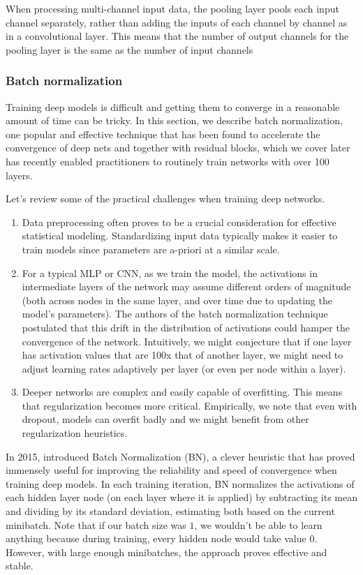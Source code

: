 When processing multi-channel input data, the pooling layer pools each input channel separately, rather than adding the inputs of each channel by channel as in a convolutional layer. This means that the number of output channels for the pooling layer is the same as the number of input channels

\subsubsection{Batch normalization}\label{subsubsec:batch-norm}

Training deep models is difficult and getting them to converge in a reasonable amount of time can be tricky. In this section, we describe batch normalization, one popular and effective technique that has been found to accelerate the convergence of deep nets and together with residual blocks, which we cover later has recently enabled practitioners  to routinely train networks with over 100 layers.

Let's review some of the practical challenges when training deep networks.

\begin{enumerate}
    \item Data preprocessing often proves to be a crucial consideration for effective statistical modeling. Standardizing input data typically makes it easier to train models since parameters are a-priori at a similar scale.
    \item For a typical MLP or CNN, as we train the model, the activations in intermediate layers of the network may assume different orders of magnitude (both across nodes in the same layer, and over time due to updating the model's parameters). The authors of the batch normalization technique postulated that this drift in the distribution of activations could hamper the convergence of the network. Intuitively, we might conjecture that if one layer has activation values that are 100x that of another layer, we might need to adjust learning rates adaptively per layer (or even per node within a layer).
    \item Deeper networks are complex and easily capable of overfitting. This means that regularization becomes more critical. Empirically, we note that even with dropout, models can overfit badly and we might benefit from other regularization heuristics.
\end{enumerate}

In 2015, \cite{Ioffe2015} introduced Batch Normalization (BN), a clever heuristic that has proved immensely useful for improving the reliability and speed of convergence when training deep models. In each training iteration, BN normalizes the activations of each hidden layer node (on each layer where it is applied) by subtracting its mean and dividing by its standard deviation, estimating both based on the current minibatch. Note that if our batch size was $1$,  we wouldn't be able to learn anything because during training, every hidden node would take value $0$. However, with large enough minibatches, the approach proves effective and stable.

